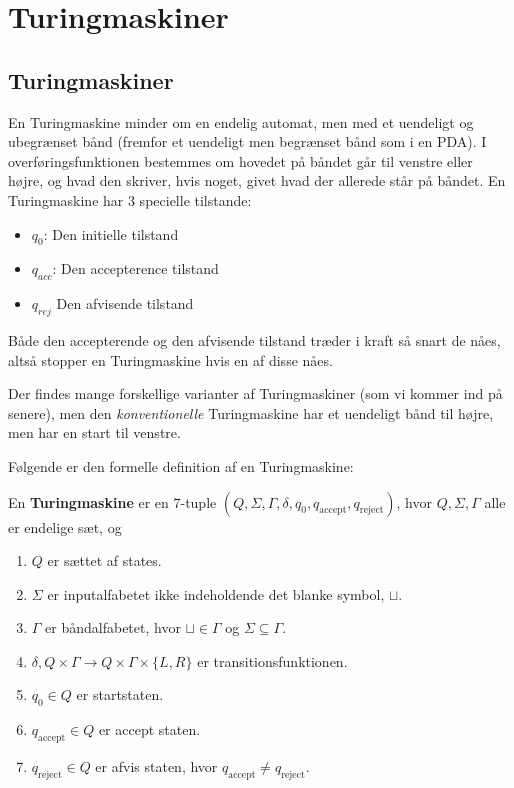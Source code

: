 \chapter{Turingmaskiner}

\section{Turingmaskiner}%
\label{sec:label}

En Turingmaskine minder om en endelig automat, men med et uendeligt og ubegrænset bånd (fremfor et uendeligt men begrænset bånd som i en PDA). I overføringsfunktionen bestemmes om hovedet på båndet går til venstre eller højre, og hvad den skriver, hvis noget, givet hvad der allerede står på båndet. En Turingmaskine har 3 specielle tilstande:
\begin{itemize}
	\item $q_{0}$: Den initielle tilstand
	\item $q_{acc}$: Den accepterence tilstand
	\item $q_{rej}$ Den afvisende tilstand
\end{itemize}

Både den accepterende og den afvisende tilstand træder i kraft så snart de nåes, altså stopper en Turingmaskine hvis en af disse nåes.

Der findes mange forskellige varianter af Turingmaskiner (som vi kommer ind på senere), men den \textit{konventionelle} Turingmaskine har et uendeligt bånd til højre, men har en start til venstre.

Følgende er den formelle definition af en Turingmaskine:

\begin{definition}
	\label{def:formalturing}
	En \textbf{Turingmaskine} er en 7-tuple $(Q, \Sigma, \Gamma, \delta, q_{0}, q_{\text{accept}}, q_{\text{reject}})$, hvor $Q, \Sigma, \Gamma$ alle er endelige sæt, og
	\begin{enumerate}
		\item $Q$ er sættet af states.
		\item $\Sigma$ er inputalfabetet ikke indeholdende det blanke symbol, $\sqcup$.
		\item $\Gamma$ er båndalfabetet, hvor $\sqcup \in \Gamma$ og $\Sigma \subseteq \Gamma$.
		\item $\delta, Q \times \Gamma \longrightarrow Q \times \Gamma \times \{L, R\}$ er transitionsfunktionen.
		\item $q_{0} \in Q$ er startstaten.
		\item $q_{\text{accept}} \in Q$ er accept staten.
		\item $q_{\text{reject}} \in Q$ er afvis staten, hvor $q_{\text{accept}} \neq q_{\text{reject}}$.
	\end{enumerate}
\end{definition}


